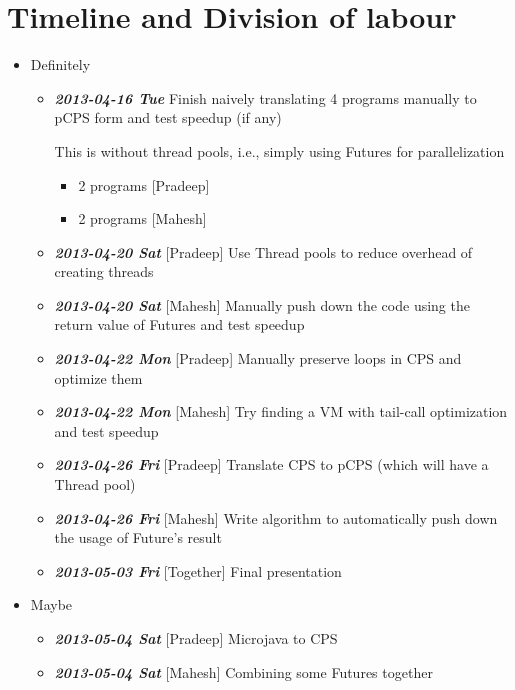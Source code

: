 \documentclass[10pt]{article}
\begin{document}
\section*{Timeline and Division of labour}
\label{sec-7}
\begin{itemize}

\item Definitely
\label{sec-7_1}%
\begin{itemize}
\item \textbf{\textit{2013-04-16 Tue}} Finish naively translating 4 programs manually to pCPS form and test speedup (if any)

     This is without thread pools, i.e., simply using Futures for parallelization

\begin{itemize}
\item 2 programs [Pradeep]
\item 2 programs [Mahesh]
\end{itemize}

\item \textbf{\textit{2013-04-20 Sat}} [Pradeep] Use Thread pools to reduce overhead of creating threads
\item \textbf{\textit{2013-04-20 Sat}} [Mahesh] Manually push down the code using the return value of Futures and test speedup
\item \textbf{\textit{2013-04-22 Mon}} [Pradeep] Manually preserve loops in CPS and optimize them
\item \textbf{\textit{2013-04-22 Mon}} [Mahesh] Try finding a VM with tail-call optimization and test speedup
\item \textbf{\textit{2013-04-26 Fri}} [Pradeep] Translate CPS to pCPS (which will have a Thread pool)
\item \textbf{\textit{2013-04-26 Fri}} [Mahesh] Write algorithm to automatically push down the usage of Future's result
\item \textbf{\textit{2013-05-03 Fri}} [Together] Final presentation
\end{itemize}


\item Maybe
\label{sec-7_2}%
\begin{itemize}
\item \textbf{\textit{2013-05-04 Sat}} [Pradeep] Microjava to CPS
\item \textbf{\textit{2013-05-04 Sat}} [Mahesh] Combining some Futures together
\end{itemize}



\end{itemize}
\end{document}
